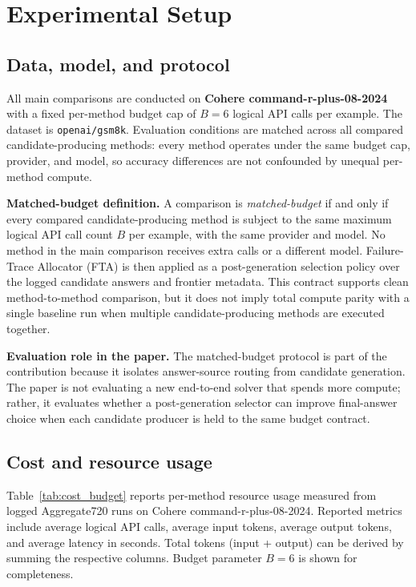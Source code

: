 \section{Experimental Setup}
\label{sec:experiments}

\subsection{Data, model, and protocol}
All main comparisons are conducted on \textbf{Cohere command-r-plus-08-2024} with a fixed per-method budget cap of $B = 6$ logical API calls per example.  The dataset is \texttt{openai/gsm8k}.  Evaluation conditions are matched across all compared candidate-producing methods: every method operates under the same budget cap, provider, and model, so accuracy differences are not confounded by unequal per-method compute.

\medskip\noindent\textbf{Matched-budget definition.} A comparison is \emph{matched-budget} if and only if every compared candidate-producing method is subject to the same maximum logical API call count $B$ per example, with the same provider and model.  No method in the main comparison receives extra calls or a different model.  Failure-Trace Allocator (FTA) is then applied as a post-generation selection policy over the logged candidate answers and frontier metadata.
This contract supports clean method-to-method comparison, but it does not imply total compute parity with a single baseline run when multiple candidate-producing methods are executed together.

\medskip\noindent\textbf{Evaluation role in the paper.}
The matched-budget protocol is part of the contribution because it isolates
answer-source routing from candidate generation. The paper is not evaluating a new
end-to-end solver that spends more compute; rather, it evaluates whether a
post-generation selector can improve final-answer choice when each candidate
producer is held to the same budget contract.

\subsection{Cost and resource usage}
\label{sec:cost}

Table~\ref{tab:cost_budget} reports per-method resource usage measured from logged Aggregate720 runs on Cohere command-r-plus-08-2024. Reported metrics include average logical API calls, average input tokens, average output tokens, and average latency in seconds.  Total tokens (input + output) can be derived by summing the respective columns.  Budget parameter $B = 6$ is shown for completeness.

